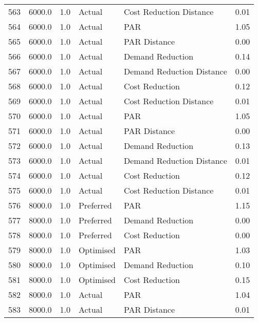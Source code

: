 \begin{longtable}{lrrllr}
563  &       6000.0 &     1.0 &         Actual &    Cost Reduction Distance &   0.01 \\
564  &       6000.0 &     1.0 &         Actual &                        PAR &   1.05 \\
565  &       6000.0 &     1.0 &         Actual &               PAR Distance &   0.00 \\
566  &       6000.0 &     1.0 &         Actual &           Demand Reduction &   0.14 \\
567  &       6000.0 &     1.0 &         Actual &  Demand Reduction Distance &   0.00 \\
568  &       6000.0 &     1.0 &         Actual &             Cost Reduction &   0.12 \\
569  &       6000.0 &     1.0 &         Actual &    Cost Reduction Distance &   0.01 \\
570  &       6000.0 &     1.0 &         Actual &                        PAR &   1.05 \\
571  &       6000.0 &     1.0 &         Actual &               PAR Distance &   0.00 \\
572  &       6000.0 &     1.0 &         Actual &           Demand Reduction &   0.13 \\
573  &       6000.0 &     1.0 &         Actual &  Demand Reduction Distance &   0.01 \\
574  &       6000.0 &     1.0 &         Actual &             Cost Reduction &   0.12 \\
575  &       6000.0 &     1.0 &         Actual &    Cost Reduction Distance &   0.01 \\
576  &       8000.0 &     1.0 &      Preferred &                        PAR &   1.15 \\
577  &       8000.0 &     1.0 &      Preferred &           Demand Reduction &   0.00 \\
578  &       8000.0 &     1.0 &      Preferred &             Cost Reduction &   0.00 \\
579  &       8000.0 &     1.0 &      Optimised &                        PAR &   1.03 \\
580  &       8000.0 &     1.0 &      Optimised &           Demand Reduction &   0.10 \\
581  &       8000.0 &     1.0 &      Optimised &             Cost Reduction &   0.15 \\
582  &       8000.0 &     1.0 &         Actual &                        PAR &   1.04 \\
583  &       8000.0 &     1.0 &         Actual &               PAR Distance &   0.01 \\

\end{longtable}
